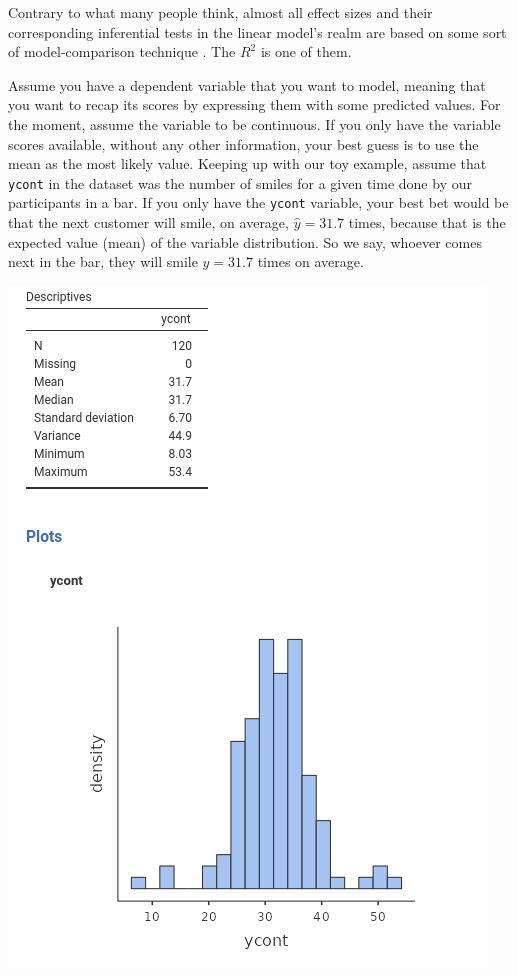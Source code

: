 \documentclass[
]{book}
\begin{document}
Contrary to what many people think, almost all effect sizes and their corresponding inferential tests in the linear model's realm are based on some sort of model-comparison technique \citep{judd2017data}. The \(R^2\) is one of them.

Assume you have a dependent variable that you want to model, meaning that you want to recap its scores by expressing them with some predicted values. For the moment, assume the variable to be continuous. If you only have the variable scores available, without any other information, your best guess is to use the mean as the most likely value. Keeping up with our toy example, assume that \texttt{ycont} in the dataset was the number of smiles for a given time done by our participants in a bar. If you only have the \texttt{ycont} variable, your best bet would be that the next customer will smile, on average, \(\hat{y}=31.7\) times, because that is the expected value (mean) of the variable distribution. So we say, whoever comes next in the bar, they will smile \(\hat{y}=31.7\) times on average.

\includegraphics{bookletpics/ap_a_output1.png}
\end{document}
